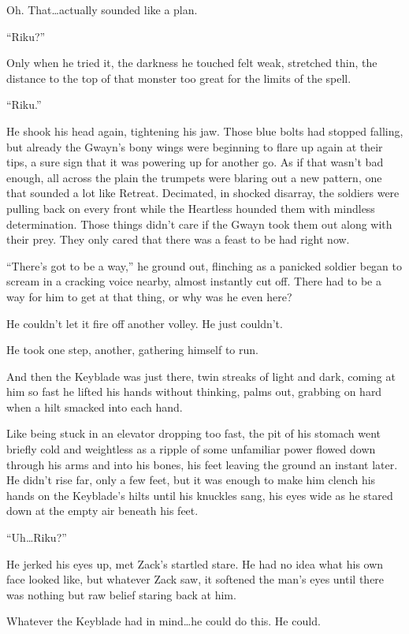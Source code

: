 Oh. That\ldots actually sounded like a plan.

``Riku?''

Only when he tried it, the darkness he touched felt weak, stretched thin, the distance to the top of that monster too great for the limits of the spell.

``Riku.''

He shook his head again, tightening his jaw. Those blue bolts had stopped falling, but already the Gwayn's bony wings were beginning to flare up again at their tips, a sure sign that it was powering up for another go. As if that wasn't bad enough, all across the plain the trumpets were blaring out a new pattern, one that sounded a lot like Retreat. Decimated, in shocked disarray, the soldiers were pulling back on every front while the Heartless hounded them with mindless determination. Those things didn't care if the Gwayn took them out along with their prey. They only cared that there was a feast to be had right now.

``There's got to be a way,'' he ground out, flinching as a panicked soldier began to scream in a cracking voice nearby, almost instantly cut off. There had to be a way for him to get at that thing, or why was he even here?

He couldn't let it fire off another volley. He just couldn't.

He took one step, another, gathering himself to run.

And then the Keyblade was just there, twin streaks of light and dark, coming at him so fast he lifted his hands without thinking, palms out, grabbing on hard when a hilt smacked into each hand.

Like being stuck in an elevator dropping too fast, the pit of his stomach went briefly cold and weightless as a ripple of some unfamiliar power flowed down through his arms and into his bones, his feet leaving the ground an instant later. He didn't rise far, only a few feet, but it was enough to make him clench his hands on the Keyblade's hilts until his knuckles sang, his eyes wide as he stared down at the empty air beneath his feet.

``Uh\ldots Riku?''

He jerked his eyes up, met Zack's startled stare. He had no idea what his own face looked like, but whatever Zack saw, it softened the man's eyes until there was nothing but raw belief staring back at him.

Whatever the Keyblade had in mind\ldots he could do this. He could.


